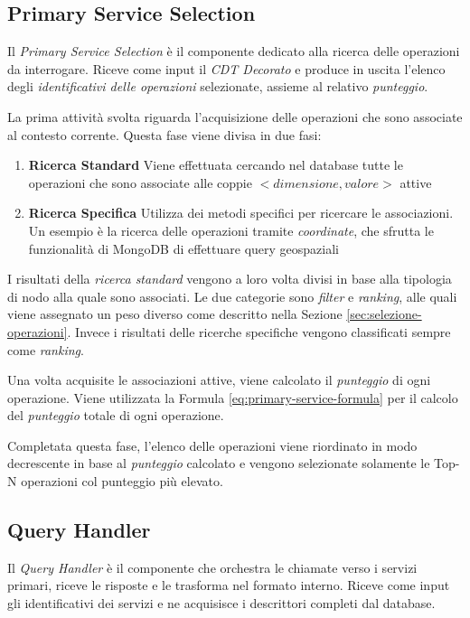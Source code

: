 \subsection{Primary Service Selection\label{sec:primary-service-selection}}

Il \emph{Primary Service Selection} è il componente dedicato alla ricerca delle operazioni da interrogare. Riceve come input il \emph{CDT Decorato} e produce in uscita l'elenco degli \emph{identificativi delle operazioni} selezionate, assieme al relativo \emph{punteggio}.

La prima attività svolta riguarda l'acquisizione delle operazioni che sono associate al contesto corrente. Questa fase viene divisa in due fasi:

\begin{enumerate}
	\item \textbf{Ricerca Standard} Viene effettuata cercando nel database tutte le operazioni che sono associate alle coppie $ {<}dimensione, valore{>} $ attive
	\item \textbf{Ricerca Specifica} Utilizza dei metodi specifici per ricercare le associazioni. Un esempio è la ricerca delle operazioni tramite \emph{coordinate}, che sfrutta le funzionalità di MongoDB di effettuare query geospaziali
\end{enumerate}

I risultati della \emph{ricerca standard} vengono a loro volta divisi in base alla tipologia di nodo alla quale sono associati. Le due categorie sono \emph{filter} e \emph{ranking}, alle quali viene assegnato un peso diverso come descritto nella Sezione \ref{sec:selezione-operazioni}. Invece i risultati delle ricerche specifiche vengono classificati sempre come \emph{ranking}.

Una volta acquisite le associazioni attive, viene calcolato il \emph{punteggio} di ogni operazione. Viene utilizzata la Formula \ref{eq:primary-service-formula} per il calcolo del \emph{punteggio} totale di ogni operazione.

Completata questa fase, l'elenco delle operazioni viene riordinato in modo decrescente in base al \emph{punteggio} calcolato e vengono selezionate solamente le Top-N operazioni col punteggio più elevato. 

\subsection{Query Handler\label{sec:query-handler}}

Il \emph{Query Handler} è il componente che orchestra le chiamate verso i servizi primari, riceve le risposte e le trasforma nel formato interno. Riceve come input gli identificativi dei servizi e ne acquisisce i descrittori completi dal database.

